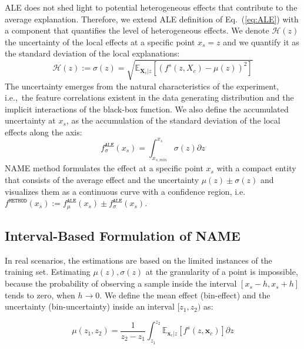 \documentclass[twoside]{article}
\newcommand{\dfdx}{f^s}
\newcommand{\xc}{\mathbf{x}_c}
\newcommand{\Xcb}{\mathbf{X}_c}
\begin{document}
ALE does not shed light to potential heterogeneous effects that
contribute to the average explanation. Therefore, we extend ALE
definition of Eq.~(\ref{eq:ALE}) with a component that quantifies the
level of heterogeneous effects. We denote \(\mathcal{H}(z)\) the
uncertainty of the local effects at a specific point \(x_s=z\) and we
quantify it as the standard deviation of the local explanations:
\begin{equation}
  \label{eq:ALE_var}
  \mathcal{H}(z) := \sigma(z) = \sqrt{\mathbb{E}_{\Xcb|z}\left [ \left (\dfdx (z, X_c) - \mu(z) \right )^2 \right ] }
\end{equation}
\noindent
The uncertainty emerges from the natural characteristics of the
experiment, i.e.,~the feature correlations existent in the data
generating distribution and the implicit interactions of the black-box
function. We also define the accumulated uncertainty at \(x_s\), as
the accumulation of the standard deviation of the local effects along
the axis:
\begin{equation}
  \label{eq:ALE_acc_unc}
  f^{\mathtt{ALE}}_{\sigma}(x_s) = \int_{x_{s, min}}^{x_s} \sigma(z) \partial z
\end{equation}
\noindent
NAME method formulates the effect at a specific point \(x_s\) with a
compact entity that consists of the average effect and the uncertainty
\(\mu(z) \pm \sigma(z)\) and visualizes them as a continuous curve
with a confidence region, i.e.
\(f^{\mathtt{METHOD}}(x_s) := f^{\mathtt{ALE}}_{\mu}(x_s) \pm
f^{\mathtt{ALE}}_{\sigma}(x_s)\). 

\subsection{Interval-Based Formulation of NAME}
\label{sec:interval-based-estimation}

In real scenarios, the estimations are based on the limited instances
of the training set. Estimating \(\mu(z), \sigma(z)\) at the
granularity of a point is impossible, because the probability of
observing a sample inside the interval \([x_s - h, x_s + h]\) tends to
zero, when \(h \to 0\). We define the mean effect (bin-effect) and the
uncertainty (bin-uncertainty) inside an interval \([z_1, z_2)\) as:

\begin{equation}
  \label{eq:mu_bin}
  \mu(z_1, z_2) = \frac{1}{z_2 - z_1} \int_{z_1}^{z_2}
  \mathbb{E}_{\xc|z}\left [f^s(z, \xc) \right ] \partial z
\end{equation}
\end{document}
